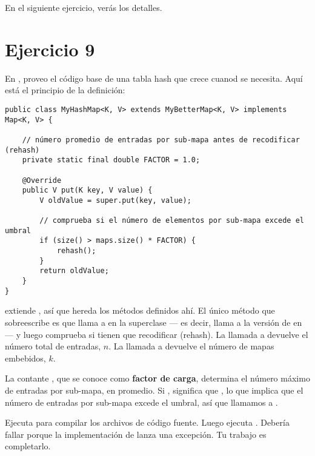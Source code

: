 \documentclass[12pt]{book}
\theoremstyle{exercise}
\begin{document}
En el siguiente ejercicio, verás los detalles.


\section{Ejercicio 9}
\label{implementing-myhashmap}


En , proveo el código base de una tabla hash que
crece cuanod se necesita. Aquí está el principio de la definición:

\begin{verbatim}
public class MyHashMap<K, V> extends MyBetterMap<K, V> implements Map<K, V> {

    // número promedio de entradas por sub-mapa antes de recodificar (rehash)
    private static final double FACTOR = 1.0;

    @Override
    public V put(K key, V value) {
        V oldValue = super.put(key, value);

        // comprueba si el número de elementos por sub-mapa excede el umbral
        if (size() > maps.size() * FACTOR) {
            rehash();
        }
        return oldValue;
    }
}
\end{verbatim}

 extiende , así que hereda los
métodos definidos ahí. El único método que sobreescribe es 
que llama a  en la superclase --- es decir,  llama a la
versión de  en  --- y luego comprueba
si tienen que recodificar (rehash). La llamada a  devuelve el
número total de entradas, $n$. La llamada a  devuelve el
número de mapas embebidos, $k$.


La contante , que se conoce como \textbf{factor de carga},
determina el número máximo de entradas por sub-mapa, en promedio. Si
, significa que
, lo que implica que el número de entradas
por sub-mapa excede el umbral, así que llamamos a .


Ejecuta  para compilar los archivos de código fuente. Luego ejecuta .  Debería fallar porque la implementación de
 lanza una excepción. Tu trabajo es completarlo.

\end{document}
